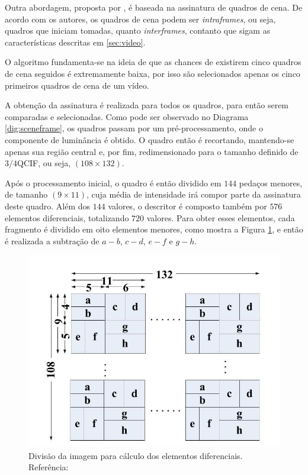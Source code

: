   Outra abordagem, proposta por \citeauthor{mao2015sceneframe}, é baseada na assinatura de quadros de cena. De acordo com os autores, os quadros de cena podem ser \textit{intraframes}, ou seja, quadros que iniciam tomadas, quanto \textit{interframes}, contanto que sigam as características descritas em \ref{sec:video}.
    
    O algoritmo fundamenta-se na ideia de que as chances de existirem cinco quadros de cena seguidos é extremamente baixa, por isso são selecionados apenas os cinco primeiros quadros de cena de um vídeo.

A obtenção da assinatura é realizada para todos os quadros, para então serem comparadas e selecionadas. Como pode ser observado no Diagrama \ref{dig:sceneframe}, os quadros passam por um pré-processamento, onde o componente de luminância é obtido. O quadro então é recortando, mantendo-se apenas sua região central e, por fim, redimensionado para o tamanho definido de $3/4$QCIF, ou seja, $(108\times132)$.

Após o processamento inicial, o quadro é então dividido em $144$ pedaços menores, de tamanho $(9\times11)$, cuja média de intensidade irá compor parte da assinatura deste quadro. Além dos $144$ valores, o descritor é composto também por $576$ elementos diferenciais, totalizando $720$ valores. Para obter esses elementos, cada fragmento é dividido em oito elementos menores, como mostra a Figura \ref{fig:divsceneframe}, e então é realizada a subtração de $a - b$, $c - d$, $e - f$ e $g - h$.

\begin{figure}[h]
  \centering
    \includegraphics[width=\textwidth]{dados/figuras/sf_division.png}
    \caption{Divisão da imagem para cálculo dos elementos diferenciais. Referência: \citeauthor{mao2015sceneframe}}
    \label{fig:divsceneframe}
\end{figure}

